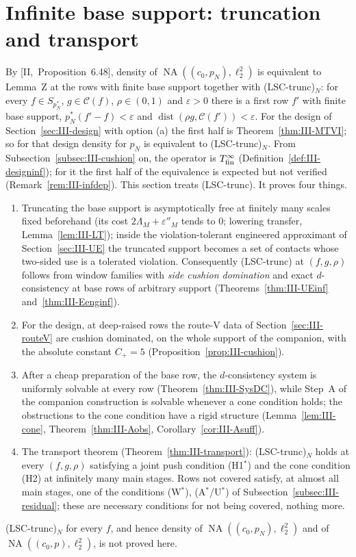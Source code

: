 \documentclass[10pt]{amsart}
\theoremstyle{definition}
\theoremstyle{remark}
\newcommand{\NA}{\operatorname{NA}}
\newcommand{\dist}{\operatorname{dist}}
\newcommand{\Cset}{\mathcal C}
\begin{document}
\section{Infinite base support: truncation and transport}\label{sec:III-inf}

By [II,~Proposition~6.48], density of $\NA((c_0,p_N),\ell_2^2)$ is
equivalent to Lemma~Z at the rows with finite base support together with
\textup{(LSC-trunc)}$_N$: for every $f\in S_{p_N^*}$, $g\in\Cset(f)$,
$\rho\in(0,1)$ and $\varepsilon>0$ there is a first row $f'$ with finite base
support, $p_N^*(f'-f)<\varepsilon$ and $\dist(\rho g,\Cset(f'))<\varepsilon$.
For the design of Section~\ref{sec:III-design} with option (a) the first half
is Theorem~\ref{thm:III-MTVI}; so for that design density for $p_N$ is
equivalent to \textup{(LSC-trunc)}$_N$.  From
Subsection~\ref{subsec:III-cushion} on, the operator is $T^\infty_{\rm fin}$
(Definition~\ref{def:III-designinf}); for it the first half of the
equivalence is expected but not verified (Remark~\ref{rem:III-infdep}).  This
section treats \textup{(LSC-trunc)}.  It proves four things.
\begin{enumerate}
\item[(1)] Truncating the base support is asymptotically free at finitely
many scales fixed beforehand (its cost $2\Lambda_M+\varepsilon''_M$ tends to
$0$; lowering transfer, Lemma~\ref{lem:III-LT}); inside the
violation-tolerant engineered approximant of Section~\ref{sec:III-UE} the
truncated support becomes a set of contacts whose two-sided use is a
tolerated violation.  Consequently \textup{(LSC-trunc)} at $(f,g,\rho)$
follows from window families with \emph{side cushion domination} and exact
$d$-consistency at base rows of arbitrary support
(Theorems~\ref{thm:III-UEinf} and~\ref{thm:III-Eenginf}).
\item[(2)] For the design, at deep-raised rows the route-V data of
Section~\ref{sec:III-routeV} are cushion dominated, on the whole support of
the companion, with the absolute constant $C_+=5$
(Proposition~\ref{prop:III-cushion}).
\item[(3)] After a cheap preparation of the base row, the $d$-consistency
system is uniformly solvable at every row (Theorem~\ref{thm:III-SysDC}),
while Step~A of the companion construction is solvable whenever a cone
condition holds; the obstructions to the cone condition have a rigid
structure (Lemma~\ref{lem:III-cone}, Theorem~\ref{thm:III-Aobs},
Corollary~\ref{cor:III-Asuff}).
\item[(4)] The transport theorem (Theorem~\ref{thm:III-transport}):
\textup{(LSC-trunc)}$_N$ holds at every $(f,g,\rho)$ satisfying a joint
push condition \textup{(H1$^*$)} and the cone condition \textup{(H2)} at
infinitely many main stages.  Rows not covered satisfy, at almost all main
stages, one of the conditions \textup{(W$^*$)}, \textup{(A$^*$/U$^*$)} of
Subsection~\ref{subsec:III-residual}; these are
necessary conditions for not being covered, nothing more.
\end{enumerate}
\textup{(LSC-trunc)}$_N$ for every $f$, and hence density of
$\NA((c_0,p_N),\ell_2^2)$ and of $\NA((c_0,p),\ell_2^2)$, is not proved here.
\end{document}

